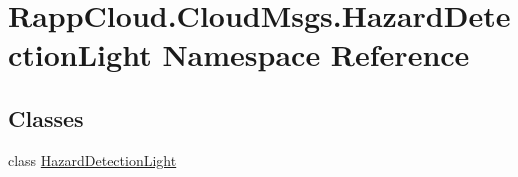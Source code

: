 \hypertarget{namespaceRappCloud_1_1CloudMsgs_1_1HazardDetectionLight}{\section{Rapp\-Cloud.\-Cloud\-Msgs.\-Hazard\-Detection\-Light Namespace Reference}
\label{namespaceRappCloud_1_1CloudMsgs_1_1HazardDetectionLight}
}
\subsection*{Classes}
\begin{DoxyCompactItemize}
\item 
class \hyperlink{classRappCloud_1_1CloudMsgs_1_1HazardDetectionLight_1_1HazardDetectionLight}{Hazard\-Detection\-Light}
\end{DoxyCompactItemize}
